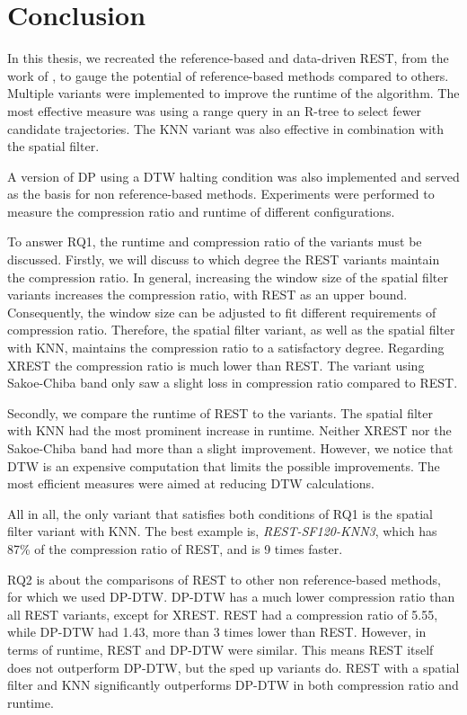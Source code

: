 \chapter{Conclusion}\label{chap:conclusion}
In this thesis, we recreated the reference-based and data-driven REST, from the work of \textcite{zhao2018rest}, to gauge the potential of reference-based methods compared to others. Multiple variants were implemented to improve the runtime of the algorithm. The most effective measure was using a range query in an R-tree to select fewer candidate trajectories. The KNN variant was also effective in combination with the spatial filter.

A version of DP using a DTW halting condition was also implemented and served as the basis for non reference-based methods. Experiments were performed to measure the compression ratio and runtime of different configurations.

To answer RQ1, the runtime and compression ratio of the variants must be discussed. Firstly, we will discuss to which degree the REST variants maintain the compression ratio. In general, increasing the window size of the spatial filter variants increases the compression ratio, with REST as an upper bound. Consequently, the window size can be adjusted to fit different requirements of compression ratio. Therefore, the spatial filter variant, as well as the spatial filter with KNN, maintains the compression ratio to a satisfactory degree. Regarding XREST the compression ratio is much lower than REST. The variant using Sakoe-Chiba band only saw a slight loss in compression ratio compared to REST.

Secondly, we compare the runtime of REST to the variants. The spatial filter with KNN had the most prominent increase in runtime. Neither XREST nor the Sakoe-Chiba band had more than a slight improvement. However, we notice that DTW is an expensive computation that limits the possible improvements. The most efficient measures were aimed at reducing DTW calculations.

All in all, the only variant that satisfies both conditions of RQ1 is the spatial filter variant with KNN. The best example is, \textit{REST-SF120-KNN3}, which has 87\% of the compression ratio of REST, and is 9 times faster.

RQ2 is about the comparisons of REST to other non reference-based methods, for which we used DP-DTW. DP-DTW has a much lower compression ratio than all REST variants, except for XREST. REST had a compression ratio of 5.55, while DP-DTW had 1.43, more than 3 times lower than REST. However, in terms of runtime, REST and DP-DTW were similar. This means REST itself does not outperform DP-DTW, but the sped up variants do. REST with a spatial filter and KNN significantly outperforms DP-DTW in both compression ratio and runtime.


